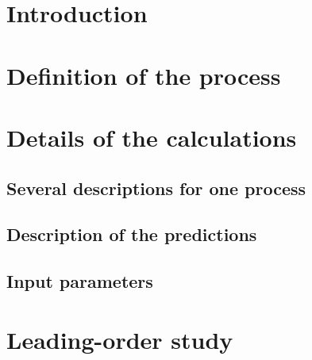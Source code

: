 \documentclass[twocolumn,epjc3]{svjour3} %
\newcommand{\AK}[1]{{ {\color{magenta}{ [AK: #1]}} }}
\begin{document}
\maketitle


\section{Introduction}


\section{Definition of the process}
    \label{sec:definition}
    

\section{Details of the calculations}
    \label{sec:details}
    \subsection{Several descriptions for one process}
        
    \subsection{Description of the predictions}
        \label{subsec:codedescr}
        
    \subsection{Input parameters}
        \label{subsec:inputpar}
        

\section{Leading-order study}
    \label{sec:LO}
\end{document}
